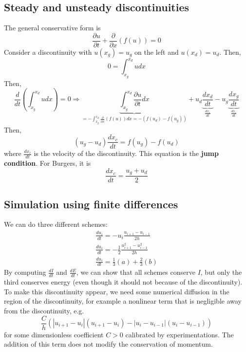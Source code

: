 \documentclass[12pt, openany]{report}
\theoremstyle{definition}
\begin{document}
\subsection{Steady and unsteady discontinuities}
The general conservative form is 
\begin{equation}
	\frac{\partial u}{\partial t}+\frac{\partial}{\partial x}(f(u))=0
\end{equation}
Consider a discontinuity with $u(x_g)=u_g$ on the left and $u(x_d)=u_d$. Then, 
\begin{equation}
	0=\int_{x_g}^{x_d}udx
\end{equation}
Then,
\begin{equation}
	\frac{d}{dt}\left(\int_{x_g}^{x_d}udx\right) = 0 \Longrightarrow \underbrace{\int_{x_g}^{x_d}\frac{\partial u}{\partial t}dx}_{ = -\int_{x_g}^{x_d}\frac{\partial}{\partial x}(f(u))dx=-(f(u_d)-f(u_g))} + u_d \underbrace{\frac{dx_d}{dt}}_{\frac{dx_c}{dt}} - u_g \underbrace{\frac{dx_g}{dt}}_{\frac{dx_c}{dt}}
\end{equation}
Then,
\begin{equation}
	(u_g-u_d)\frac{dx_c}{dt} = f(u_g)-f(u_d)
\end{equation}
where $\frac{dx_c}{dt}$ is the velocity of the discontinuity. This equation is the \textbf{jump condition}. For Burgers, it is 
\begin{equation}
	\frac{dx_c}{dt} = \frac{u_g+u_d}{2}
\end{equation}
\subsection{Simulation using finite differences}
We can do three different schemes: 
\begin{equation}
	\begin{aligned}
		\frac{du_i}{dt} = -u_i \frac{u_{i+1}-u_{i-1}}{2h}\\
		\frac{du_i}{dt} = -\frac{1}{2}\frac{u_{i+1}^2-u_{i-1}^2}{2h}\\
		\frac{du_i}{dt} = \frac{1}{3}(a) + \frac{2}{3}(b)
	\end{aligned}
\end{equation}
By computing $\frac{dI}{dt}$ and $\frac{dE}{dt}$, we can show that all schemes conserve $I$, but only the third conserves energy (even though it should not because of the discontinuity). To make this discontinuity appear, we need some numerical diffusion in the region of the discontinuity, for example a nonlinear term that is negligible away from the discontinuity, e.g. 
\begin{equation}
	\frac{C}{h}\left(|u_{i+1}-u_i|(u_{i+1}-u_i)-|u_i-u_{i-1}|(u_i-u_{i-1})\right)
\end{equation} 
for some dimensionless coefficient $C>0$ calibrated by experimentations. The addition of this term does not modify the conservation of momentum. 
\end{document}
